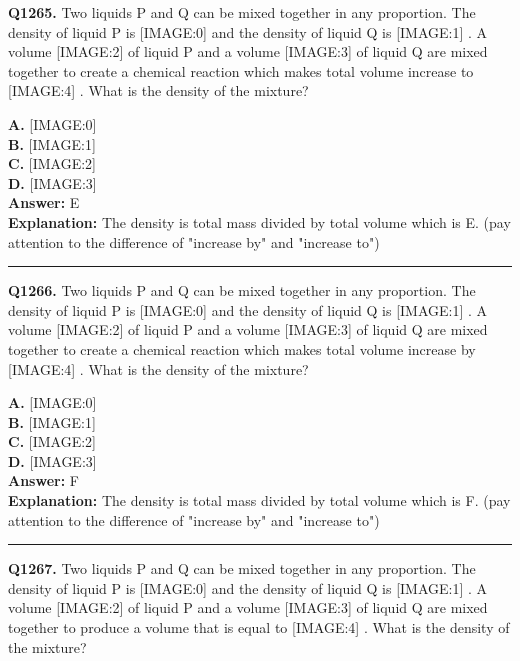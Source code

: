 \documentclass[12pt]{article}
\begin{document}
\noindent
\textbf{Q1265.} Two liquids P and Q can be mixed together in any proportion. The density of liquid P is
[IMAGE:0]
and the density of liquid Q is
[IMAGE:1]
. A volume
[IMAGE:2]
of liquid P and a volume
[IMAGE:3]
of liquid Q are mixed together to create a chemical reaction which makes total volume increase to
[IMAGE:4]
. What is the density of the mixture?



\textbf{A.} [IMAGE:0] \\
\textbf{B.} [IMAGE:1] \\
\textbf{C.} [IMAGE:2] \\
\textbf{D.} [IMAGE:3] \\

\textbf{Answer:} E \\
\textbf{Explanation:} The density is total mass divided by total volume which is E. (pay attention to the difference of "increase by" and "increase to")

\hrule
\vspace{1em}


\noindent
\textbf{Q1266.} Two liquids P and Q can be mixed together in any proportion. The density of liquid P is
[IMAGE:0]
and the density of liquid Q is
[IMAGE:1]
. A volume
[IMAGE:2]
of liquid P and a volume
[IMAGE:3]
of liquid Q are mixed together to create a chemical reaction which makes total volume increase by
[IMAGE:4]
. What is the density of the mixture?



\textbf{A.} [IMAGE:0] \\
\textbf{B.} [IMAGE:1] \\
\textbf{C.} [IMAGE:2] \\
\textbf{D.} [IMAGE:3] \\

\textbf{Answer:} F \\
\textbf{Explanation:} The density is total mass divided by total volume which is F. (pay attention to the difference of "increase by" and "increase to")

\hrule
\vspace{1em}


\noindent
\textbf{Q1267.} Two liquids P and Q can be mixed together in any proportion. The density of liquid P is
[IMAGE:0]
and the density of liquid Q is
[IMAGE:1]
. A volume
[IMAGE:2]
of liquid P and a volume
[IMAGE:3]
of liquid Q are mixed together to produce a volume that is equal to
[IMAGE:4]
. What is the density of the mixture?
\end{document}
